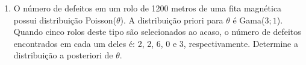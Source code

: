 \documentclass[11pt,a4]{article}\usepackage[]{graphicx}\usepackage[]{xcolor}
\begin{document}
\begin{enumerate}
\begin{solucao}
  A distribuição de probabilidade para a variável observável $Y$ é:
  \[    f(y_i|\theta) = \frac{{\rm e}^{-L_i \theta}(L_i \theta)^y_i}{y_i!} \]
  A priori conjugada neste caso é uma distribuição Gama.
  \[ f(\theta|p, q) = \frac{q^p}{\Gamma(p)} \theta^{p-1} {\rm e}^{-q \theta} \] 
  Obtenção da expressão da posteriori:
  \begin{align*} 
    L(y|\theta) &= \frac{{\rm e}^{-\theta \sum_i L_i } \prod_i (N_i^{y_i}) \theta^{\sum_i y_i}}{\prod_i y!} \\    
    f(\theta|y) &\propto f(\theta)  \cdot L(y|\theta) \\
                &\propto \theta^{p+(\sum_i y_i) -1} {\rm e}^{- (q+\sum_i L_i)\theta} \\   
    \theta|y &\sim {\rm Ga}(p+\sum_i y_i ; q+\sum_i L_i )   
  \end{align*}
  Obtenção da expressão da preditiva:
\end{solucao}   


\item O número de defeitos em um rolo de 1200 metros de uma fita magnética possui distribuição 
  Poisson($\theta$). A distribuição priori para $\theta$ é Gama($3;1$). 
  Quando cinco rolos deste tipo são selecionados ao acaso, o número de defeitos encontrados em cada um deles é: 2, 2, 6, 0 e 3, respectivamente. 
  Determine a distribuição a posteriori de $\theta$.
  
  

\end{enumerate}
\end{document}
